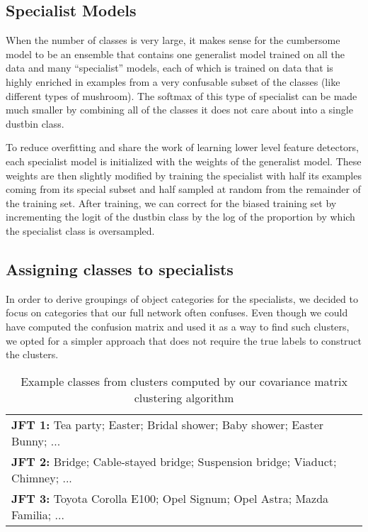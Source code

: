 \subsection{Specialist Models}\label{sec:specialists}

When the number of classes is very large, it makes sense for the
cumbersome model to be an ensemble that contains one generalist 
model trained on all the data and  many ``specialist''
models, each of which is trained on data that is highly enriched in
examples from a very confusable subset of the classes (like different
types of mushroom). The softmax of this type of specialist can be made
much smaller by combining all of the classes it does not care about into a
single dustbin class. 

To reduce overfitting and share the work of learning lower level feature detectors, each specialist model is initialized
with the weights of the generalist model. These weights are then slightly modified by training the
specialist with half its examples coming from its special subset and half sampled at random from the remainder of the
training set. After training, we can correct for the biased training set by incrementing the logit
of the dustbin class by the log of the proportion by which the specialist class is oversampled.



\subsection{Assigning classes to specialists}

In order to derive groupings of object categories for the specialists, we decided to focus on categories that our full
network often confuses. Even though we could have computed the confusion matrix and used it as a way to find such
clusters, we opted for a simpler approach that does not require the true labels to construct the clusters.

\begin{table}
\small
\centering
\begin{tabular}{|l|}
\hline
\textbf{JFT 1:} Tea party; Easter; Bridal shower; Baby shower; Easter Bunny;  ... \\
\textbf{JFT 2:} Bridge; Cable-stayed bridge; Suspension bridge; Viaduct; Chimney; ... \\
\textbf{JFT 3:} Toyota Corolla E100; Opel Signum; Opel Astra; Mazda Familia; ... \\
\hline
\end{tabular}
\caption{Example classes from clusters computed by our
  covariance matrix clustering algorithm}\label{tab:example_clusters}
\end{table}


